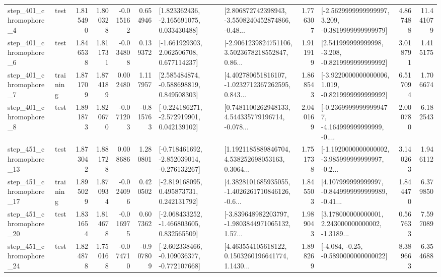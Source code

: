 \begin{tabular}{llrrrrllrlrr}
   step\_401\_chromophore\_4 &      test &      1.815490 &    1.800328 &     -0.015162 &  0.654946 &    [1.823362436, -2.165691075, 0.033430488] &  [2.806872742398943, -3.5508240452874866, -0.48... &       1.776307 &  [-2.5629999999999997, 3.209, -0.3819999999999979] &            4.867488 &         11.441079 \\
   step\_401\_chromophore\_6 &      test &      1.846538 &    1.811731 &     -0.034808 &  0.139372 &    [-1.661929303, 2.062506708, 0.677114237] &  [-2.9061239824751106, 3.5023678218552847, 0.86... &       1.911919 &   [2.541999999999998, -3.208, -0.8219999999999992] &            3.018791 &          1.415175 \\
   step\_401\_chromophore\_7 &  training &      1.871709 &    1.874189 &      0.002480 &  1.117957 &    [2.585484874, -0.588698819, 0.849508303] &  [4.402780651816107, -1.0232712367262595, 0.843... &       1.868543 &  [-3.9220000000000006, 1.019, -0.8219999999999992] &            6.517094 &          1.706674 \\
   step\_401\_chromophore\_8 &      test &      1.891873 &    1.820670 &     -0.071203 & -0.815763 &   [-0.224186271, -2.572919901, 0.042139102] &  [0.7481100262948133, 4.544335779196714, -0.078... &       2.040169 &  [-0.23699999999999477, -4.164999999999999, -0.... &            2.000780 &          6.182543 \\
  step\_451\_chromophore\_13 &      test &      1.873042 &    1.881728 &      0.008686 &  1.280801 &  [-0.718461692, -2.852039014, -0.276132267] &  [1.1921185889846704, 4.538252698053163, 0.3064... &       1.751738 &  [-1.1920000000000002, -3.985999999999997, -0.2... &            3.140263 &          1.946112 \\
  step\_451\_chromophore\_17 &  training &      1.895029 &    1.870934 &     -0.024096 &  0.420502 &    [-2.819168095, 0.495873731, 0.242131792] &  [4.3828101685935055, -1.4026261710846126, -0.6... &       1.845503 &  [4.107999999999997, -0.8449999999999989, -0.41... &            1.844470 &          6.379850 \\
  step\_451\_chromophore\_20 &      test &      1.831654 &    1.814678 &     -0.016975 &  0.607362 &   [-2.068433252, -1.466803605, 0.832565509] &  [-3.839648982203797, -1.9803844971065132, 1.57... &       1.989043 &  [3.178000000000001, 2.243000000000002, -1.3189... &            0.567633 &          7.597089 \\
  step\_451\_chromophore\_24 &      test &      1.824878 &    1.750168 &     -0.074710 & -0.907809 &  [-2.602338466, -0.109036377, -0.772107668] &  [4.463554105618122, 0.1503260196641774, 1.1430... &       1.898269 &               [-4.084, -0.25, -0.5890000000000022] &            8.389663 &          6.354688 \\

\end{tabular}
